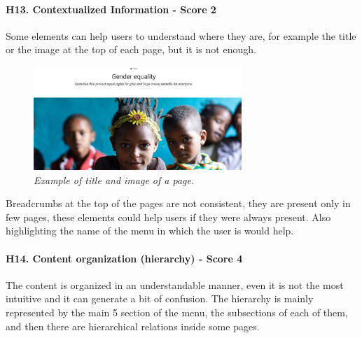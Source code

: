 \newline
\newline \paragraph{H13. Contextualized Information - Score 2}	Some elements can help users to understand where they are, for example the title or the image at the top of each page, but it is not enough.
\begin{figure}[!h]
	\begin{center}
		\includegraphics[width=0.7\textwidth]{FinalScores17.jpg}
		\captionsetup{font=small}
		\caption{\textit{Example of title and image of a page.}}
	\end{center}
\end{figure}
\newline Breadcrumbs at the top of the pages are not consistent, they are present only in few pages, these elements could help users if they were always present.
\newline Also highlighting the name of the menu in which the user is would help.
\newline
\newline \paragraph{H14. Content organization (hierarchy) - Score 4}	The content is organized in an understandable manner, even it is not the most intuitive and it can generate a bit of confusion.
\newline The hierarchy is mainly represented by the main 5 section of the menu, the subsections of each of them, and then there are hierarchical relations inside some pages.   
